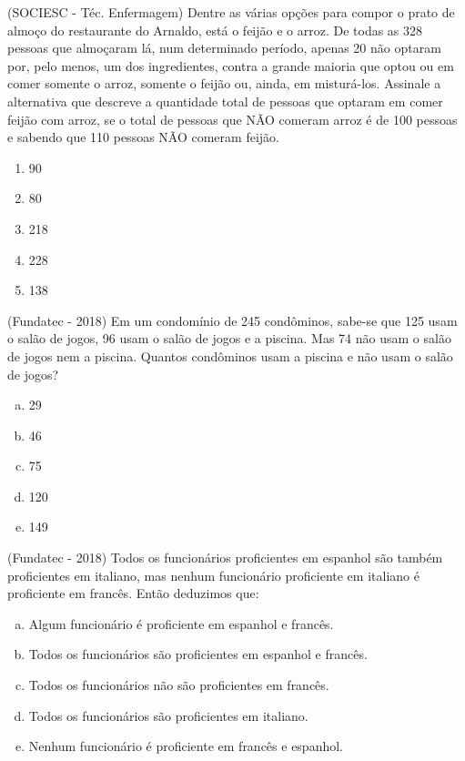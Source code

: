 \begin{exer}
(SOCIESC - Téc. Enfermagem) Dentre as várias opções para compor o prato de almoço do restaurante do Arnaldo, está o feijão e o arroz. De todas as 328 pessoas que almoçaram lá, num determinado período, apenas 20 não optaram por, pelo menos, um dos ingredientes, contra a grande maioria que optou ou em comer somente o arroz, somente o feijão ou, ainda, em misturá-los. Assinale a alternativa que descreve a quantidade total de pessoas que optaram em comer feijão com arroz, se o total de pessoas que NÃO comeram arroz é de 100 pessoas e sabendo que 110 pessoas NÃO comeram feijão.
  \begin{enumerate}
  \item 90
  \item 80
  \item 218
  \item 228
  \item 138
 \end{enumerate}
 \end{exer}

 \begin{exer}
(Fundatec - 2018) Em um condomínio de 245 condôminos, sabe-se que 125 usam o salão de jogos, 96 usam o salão de jogos e a piscina. Mas 74 não usam o salão de jogos nem a piscina. Quantos condôminos usam a piscina e não usam o salão de jogos?
\begin{multicols}{5}
\begin{enumerate}[a)]
\item 29
\item 46
\item 75
\item 120
\item 149
\end{enumerate}
\end{multicols}
\end{exer}

\begin{exer}
(Fundatec - 2018) Todos os funcionários proficientes em espanhol são também proficientes em italiano, mas nenhum funcionário proficiente em italiano é proficiente em francês. Então deduzimos que:
\begin{enumerate}[a)]
\item Algum funcionário é proficiente em espanhol e francês.
\item Todos os funcionários são proficientes em espanhol e francês.
\item Todos os funcionários não são proficientes em francês.
\item Todos os funcionários são proficientes em italiano.
\item Nenhum funcionário é proficiente em francês e espanhol.
\end{enumerate}
\end{exer}

